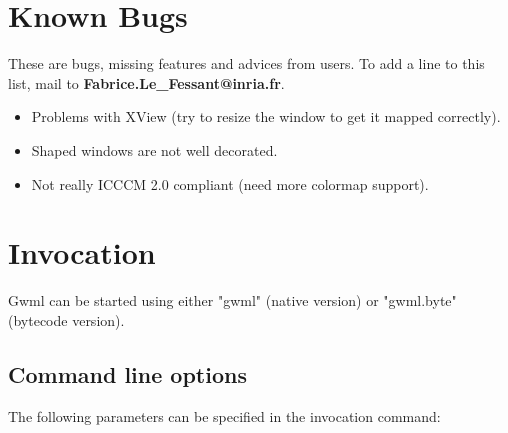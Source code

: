 \documentclass{book}
\begin{document}
\section{Known Bugs}

  These are bugs, missing features and advices from users. To add a line to
this list, mail to {\bf Fabrice.Le\_Fessant@inria.fr}.

\begin{itemize}
\item Problems with XView (try to resize the window to get it mapped correctly).
\item Shaped windows are not well decorated.
\item Not really ICCCM 2.0 compliant (need more colormap support).
\end{itemize}

\section{Invocation}

 Gwml can be started using either "gwml" (native version) or "gwml.byte" 
(bytecode version). 

\subsection{Command line options}

The following parameters can be specified in the 
invocation command:
\end{document}
